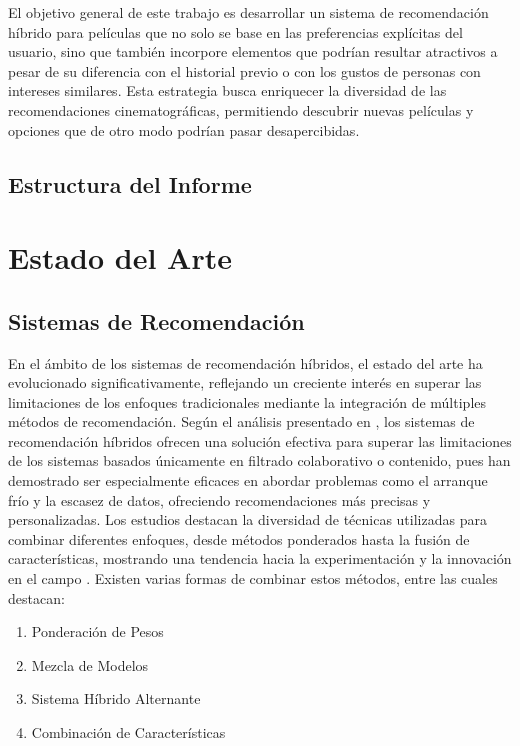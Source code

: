 \documentclass[a4paper,12pt]{report}
\begin{document}
El objetivo general de este trabajo es desarrollar un sistema de recomendación híbrido para películas que no solo se base en las preferencias explícitas del usuario, sino que también incorpore elementos que podrían resultar atractivos a pesar de su diferencia con el historial previo o con los gustos de personas con intereses similares. Esta estrategia busca enriquecer la diversidad de las recomendaciones cinematográficas, permitiendo descubrir nuevas películas y opciones que de otro modo podrían pasar desapercibidas.


\section{Estructura del Informe}

\chapter{Estado del Arte}
\section{Sistemas de Recomendación}
En el ámbito de los sistemas de recomendación híbridos, el estado del arte ha evolucionado significativamente, reflejando un creciente interés en superar las limitaciones de los enfoques tradicionales mediante la integración de múltiples métodos de recomendación. Según el análisis presentado en \cite{hybridRecommenderSystemReview}, los sistemas de recomendación híbridos ofrecen una solución efectiva para superar las limitaciones de los sistemas basados únicamente en filtrado colaborativo o contenido, pues han demostrado ser especialmente eficaces en abordar problemas como el arranque frío y la escasez de datos, ofreciendo recomendaciones más precisas y personalizadas. Los estudios destacan la diversidad de técnicas utilizadas para combinar diferentes enfoques, desde métodos ponderados hasta la fusión de características, mostrando una tendencia hacia la experimentación y la innovación en el campo \cite{recommendationModelsTourism} . 
Existen varias formas de combinar estos métodos, entre las cuales destacan:
\begin{enumerate}
    \item Ponderación de Pesos 
    \item Mezcla de Modelos
    \item Sistema Híbrido Alternante
    \item Combinación de Características
    
\end{enumerate}
\end{document}
